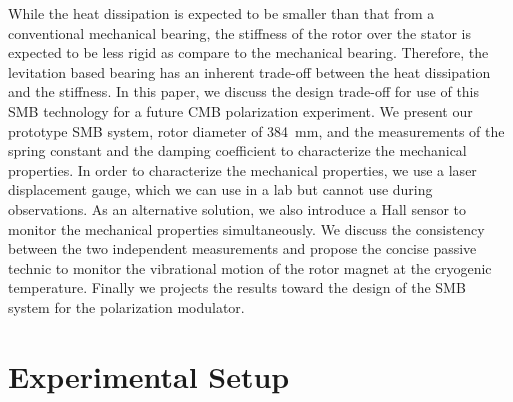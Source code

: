 \documentclass[a4paper]{jpconf}
\newcommand{\cred}[1]{{\color{red}#1}}
\begin{document}
While the heat dissipation is expected to be smaller than that from a conventional mechanical bearing, the stiffness of the rotor over the stator is expected to be less rigid as compare to the mechanical bearing.
Therefore, the levitation based bearing has an inherent trade-off between the heat dissipation and the stiffness.
In this paper, we discuss the design trade-off for use of this SMB technology for a future CMB polarization experiment.
We present our prototype SMB system, rotor diameter of 384~mm, and the measurements of the spring constant and the damping coefficient to characterize the mechanical properties.
In order to characterize the mechanical properties, we use a laser displacement gauge, which we can use in a lab but cannot use during observations.
As an alternative solution, we also introduce a Hall sensor to monitor the mechanical properties simultaneously.
We discuss the consistency between the two independent measurements and propose the concise passive technic to monitor the vibrational motion of the rotor magnet at the cryogenic temperature.
Finally we projects the results toward the design of the SMB system for the polarization modulator.


\section*{Experimental Setup}
\end{document}

